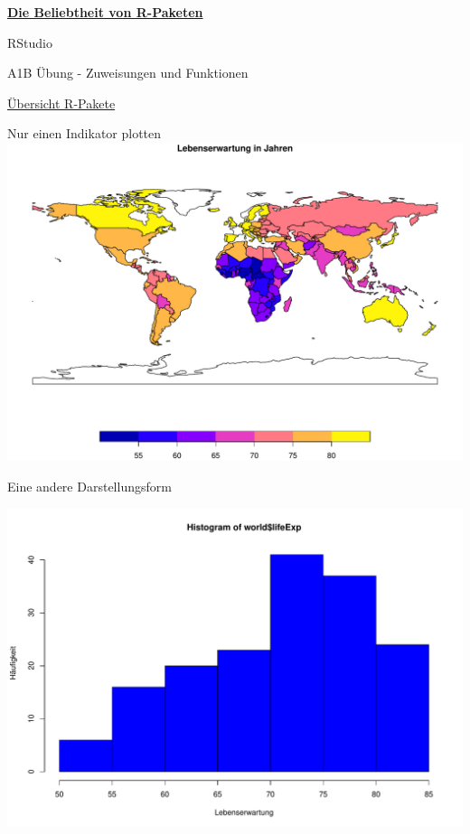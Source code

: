 \documentclass[ignorenonframetext,]{beamer}
\newenvironment{Shaded}{\begin{snugshade}}{\end{snugshade}}
\newcommand{\KeywordTok}[1]{\textcolor[rgb]{0.13,0.29,0.53}{\textbf{#1}}}
\newcommand{\DataTypeTok}[1]{\textcolor[rgb]{0.13,0.29,0.53}{#1}}
\newcommand{\StringTok}[1]{\textcolor[rgb]{0.31,0.60,0.02}{#1}}
\newcommand{\OperatorTok}[1]{\textcolor[rgb]{0.81,0.36,0.00}{\textbf{#1}}}
\newcommand{\NormalTok}[1]{#1}
\newcommand{\DataTypeTok}[1]{\textcolor[rgb]{0.13,0.29,0.53}{#1}}
\newcommand{\KeywordTok}[1]{\textcolor[rgb]{0.13,0.29,0.53}{\textbf{#1}}}
\newcommand{\NormalTok}[1]{#1}
\newcommand{\OperatorTok}[1]{\textcolor[rgb]{0.81,0.36,0.00}{\textbf{#1}}}
\newcommand{\StringTok}[1]{\textcolor[rgb]{0.31,0.60,0.02}{#1}}
\begin{document}
\begin{frame}{\href{https://gallery.shinyapps.io/cran-gauge/}{\textbf{Die
Beliebtheit von R-Paketen}}}
\begin{frame}{RStudio}
\begin{frame}[fragile]{A1B Übung - Zuweisungen und Funktionen}
\begin{frame}{\href{https://www.youtube.com/watch?v=kKI9--Opmso}{Übersicht
R-Pakete}}
\begin{frame}[fragile]{Nur einen Indikator plotten}
\includegraphics{A1_HalloWelt_files/figure-beamer/unnamed-chunk-20-1.pdf}

\end{frame}

\begin{frame}[fragile]{Eine andere Darstellungsform}

\begin{Shaded}
\end{Shaded}

\includegraphics{A1_HalloWelt_files/figure-beamer/unnamed-chunk-21-1.pdf}


\end{frame}
\end{frame}
\end{frame}
\end{frame}
\end{frame}
\end{document}
